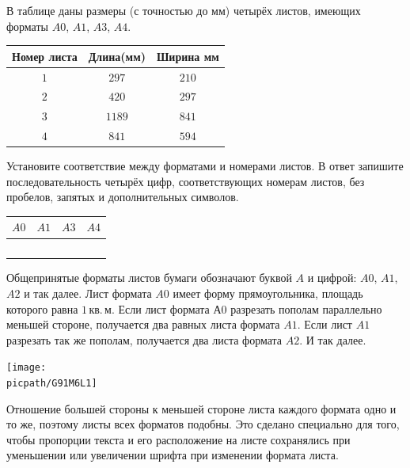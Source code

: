 %
%

\begin{class}[number=1]
	\begin{listofex}
		\item В таблице даны размеры (с точностью до мм) четырёх листов, имеющих форматы \( A0 \), \( A1 \), \( A3 \), \( A4 \).
		\begin{center}
			\footnotesize
			\begin{tabular}{|c|c|c|}
				\hline
				\rowcolor{gray}\textbf{Номер листа}&\textbf{Длина(мм)}&\textbf{Ширина мм}\\
				\hline
				\( 1 \)&\( 297 \)&\( 210 \)\\
				\hline
				\( 2 \)&\( 420 \)&\( 297 \)\\
				\hline
				\( 3 \)&\( 1189 \)&\( 841 \)\\
				\hline
				\( 4 \)&\( 841 \)&\( 594 \)\\
				\hline
			\end{tabular}
		\end{center}
		Установите соответствие между форматами и номерами листов. В ответ запишите последовательность четырёх цифр, соответствующих номерам листов, без пробелов, запятых и дополнительных символов.
		\begin{center}
			\footnotesize
			\begin{tabular}{|c|c|c|c|}
				\hline
				\textbf{\( A0 \)}&\textbf{\( A1 \)}&\textbf{\( A3 \)}&\textbf{\( A4 \)}\\
				\hline
				\(  \)&\(  \)&\(  \)&\(  \)\\
				\hline
			\end{tabular}
		\end{center}
		Общепринятые форматы листов бумаги обозначают буквой \( A \) и цифрой: \( A0 \), \( A1 \), \( A2 \) и так далее. Лист формата \( A0 \) имеет форму прямоугольника, площадь которого равна \( 1 \) кв. м. Если лист формата А0 разрезать пополам параллельно меньшей стороне, получается два равных листа формата \( A1 \). Если лист \( A1 \) разрезать так же пополам, получается два листа формата \( A2 \). И так далее.
		\begin{center}
			\texttt{[image: \\picpath/G91M6L1]}
		\end{center}
		Отношение большей стороны к меньшей стороне листа каждого формата одно и то же, поэтому листы всех форматов подобны. Это сделано специально для того, чтобы пропорции текста и его расположение на листе сохранялись при уменьшении или увеличении шрифта при изменении формата листа.

\end{listofex}
\end{class}
